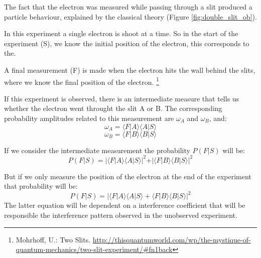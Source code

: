 The fact that the electron was measured while passing through a slit produced a particle behaviour, explained by the classical theory (Figure \ref{fig:double_slit_ob}). 


In this experiment a single electron is shoot at a time. So in the start of the experiment (S), we know the initial position of the electron, this corresponds to the.

A final measurement (F) is made when the electron hits the wall behind the slits, where we know the final position of the electron.
\footnote{Mohrhoff, U.: Two Slits. \url{ http://thisquantumworld.com/wp/the-mystique-of-quantum-mechanics/two-slit-experiment/#fn1back}}

If this experiment is observed, there is an intermediate measure that tells us whether the electron went throught the slit A or B. The corresponding probability amplitudes related to this measurement are $\omega_{A}$ and $\omega_{B}$, and:
\begin{equation}
\omega_{A} = \langle F \vert A\rangle \langle A \vert S\rangle
\end{equation}
\begin{equation}
\omega_{B} = \langle F \vert B\rangle \langle B \vert S\rangle
\end{equation}

If we consider the intermediate measurement the probability $P(F\vert S)$ will be:
\begin{equation}
P(F\vert S) = 
\vert \langle F \vert A\rangle \langle A \vert S\rangle \vert^{2}
+
\vert \langle F \vert B\rangle \langle B \vert S\rangle \vert^{2}
\end{equation}

But if we only measure the position of the electron at the end of the experiment that probability will be:
\begin{equation}
P(F\vert S) = 
\vert \langle F \vert A\rangle \langle A \vert S\rangle 
+
 \langle F \vert B\rangle \langle B \vert S\rangle \vert^{2}
\end{equation}
The latter equation will be dependent on a interference coefficient that will be responsible the interference pattern observed in the unobserved experiment.

